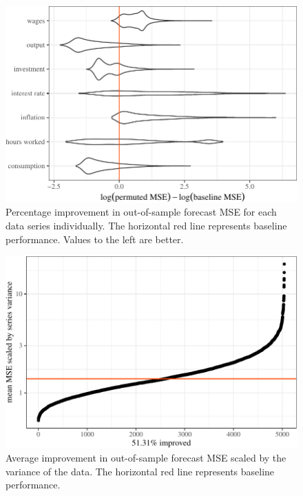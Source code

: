 \documentclass[11pt]{article}
\begin{document}
\begin{figure}[t]

{\centering \includegraphics{gfx/series-percent-improvement-1} 

}

\caption{Percentage improvement in out-of-sample forecast MSE for each data series individually. The horizontal red line represents baseline performance. Values to the left are better.}\label{fig:series-percent-improvement}
\end{figure}

\begin{figure}[t]

{\centering \includegraphics{gfx/mean-scaled-mse-1} 

}

\caption{Average improvement in out-of-sample forecast MSE scaled by the variance of the data. The horizontal red line represents baseline performance.}\label{fig:mean-scaled-mse}
\end{figure}
\end{document}
